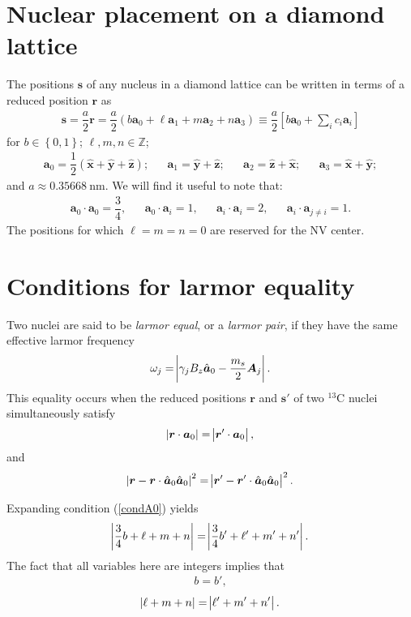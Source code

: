 \documentclass[11pt]{article}
\renewcommand{\t}{\text} %
\newcommand{\f}[2]{\dfrac{#1}{#2}} %
\newcommand{\p}[1]{\left(#1\right)} %
\renewcommand{\sp}[1]{\left[#1\right]} %
\renewcommand{\set}[1]{\left\{#1\right\}} %
\renewcommand{\v}{\bm} %
\newcommand{\uv}[1]{\hat{\v{#1}}} %
\renewcommand{\c}{\cdot} %
\renewcommand{\l}{\ell} %
\begin{document}
\newpage
\section*{Nuclear placement on a diamond lattice}

The positions $\v s$ of any nucleus in a diamond lattice can be
written in terms of a reduced position $\v r$ as
\begin{align}
  \v s=\f{a}2\v r=\f{a}2\p{b\v a_0+\l\v a_1+m\v a_2+n\v a_3} \equiv
  \f{a}2\sp{b\v a_0+\sum_ic_i\v a_i}
\end{align}
for $b\in\set{0,1}$; $\l,m,n\in\mathbb{Z}$;
\begin{align}
  \v a_0=\f12\p{\uv x+\uv y+\uv z}; && \v a_1=\uv y+\uv z; && \v
  a_2=\uv z+\uv x; && \v a_3=\uv x+\uv y;
\end{align}
and $a\approx0.35668~\t{nm}$. We will find it useful to note that:
\begin{align}
  \v a_0\c\v a_0=\f34, && \v a_0\c\v a_i=1, && \v a_i\c\v a_i=2, && \v
  a_i\c\v a_{j\ne i}=1.
\end{align}
The positions for which $\l=m=n=0$ are reserved for the NV center.

\section*{Conditions for larmor equality}

Two nuclei are said to be {\it larmor equal}, or a {\it larmor pair},
if they have the same effective larmor frequency
\begin{align}
  \omega_j=\abs{\gamma_j B_z\uv a_0-\f{m_s}2\v A_j}.
\end{align}
This equality occurs when the reduced positions $\v r$ and $\v s'$ of
two $^{13}$C nuclei simultaneously satisfy
\begin{align}
  \abs{\v r\c\v a_0}=\abs{\v r'\c\v a_0}, \label{condA0}
\end{align}
and
\begin{align}
  \abs{\v r-\v r\c\uv a_0\uv a_0}^2 =\abs{\v r'-\v r'\c\uv a_0\uv
    a_0}^2. \label{condB0}
\end{align}

Expanding condition (\ref{condA0}) yields
\begin{align}
  \abs{\f34b+\l+m+n}=\abs{\f34b'+\l'+m'+n'}. \label{condA}
\end{align}
The fact that all variables here are integers implies that
\begin{align}
  b=b', \label{condAa}
\end{align}
\begin{align}
  \abs{\l+m+n}=\abs{\l'+m'+n'}. \label{condAb}
\end{align}
\end{document}
